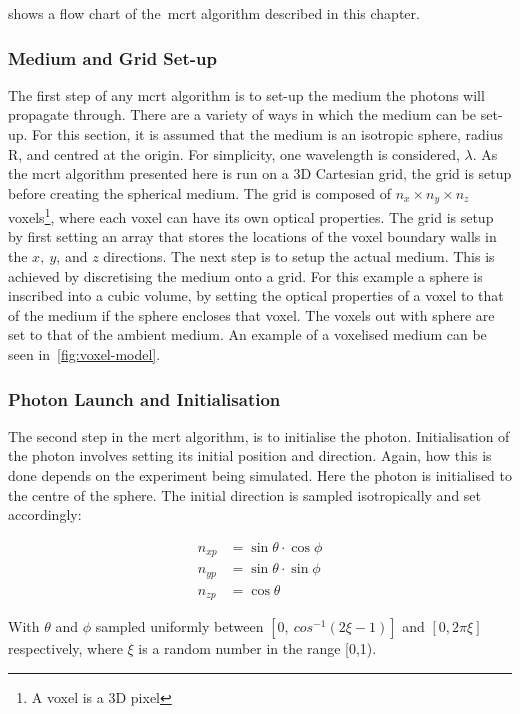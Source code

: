  shows a flow chart of the~\gls*{mcrt} algorithm described in this chapter.


\subsubsection*{Medium and Grid Set-up}\label{sec:algomedium}
The first step of any \gls*{mcrt} algorithm is to set-up the medium the photons will propagate through. There are a variety of ways in which the medium can be set-up. For this section, it is assumed that the medium is an isotropic sphere, radius R, and centred at the origin. For simplicity, one wavelength is considered, $\lambda$. As the \gls*{mcrt} algorithm presented here is run on a 3D Cartesian grid, the grid is setup before creating the spherical medium. The grid is composed of $n_x \times n_y \times n_z$ voxels\footnote{A voxel is a 3D pixel}, where each voxel can have its own optical properties.
The grid is setup by first setting an array that stores the locations of the voxel boundary walls in the $x,\ y$, and $z$ directions. 
The next step is to setup the actual medium. This is achieved by discretising the medium onto a grid. 
For this example a sphere is inscribed into a cubic volume, by setting the optical properties of a voxel to that of the medium if the sphere encloses that voxel. The voxels out with sphere are set to that of the ambient medium. An example of a voxelised medium can be seen in~\cref{fig:voxel-model}. 


\subsubsection*{Photon Launch and Initialisation}\label{sec:photlaunch}

The second step in the \gls*{mcrt} algorithm, is to initialise the photon. Initialisation of the photon involves setting its initial position and direction. Again, how this is done depends on the experiment being simulated. Here the photon is initialised to the centre of the sphere. The initial direction is sampled isotropically and set accordingly:

\begin{align}
n_{xp}&=\sin\theta \cdot \cos\phi \label{eqn:dirvec1}\\
n_{yp}&=\sin\theta \cdot \sin\phi \label{eqn:dirvec2}\\
n_{zp}&=\cos\theta \label{eqn:dirvec3}
\end{align}


With $\theta$ and $\phi$ sampled uniformly between $[0,\ cos^{-1}(2\xi-1)]$ and $[0,2\pi\xi]$ respectively, where $\xi$ is a random number in the range [0,1).

